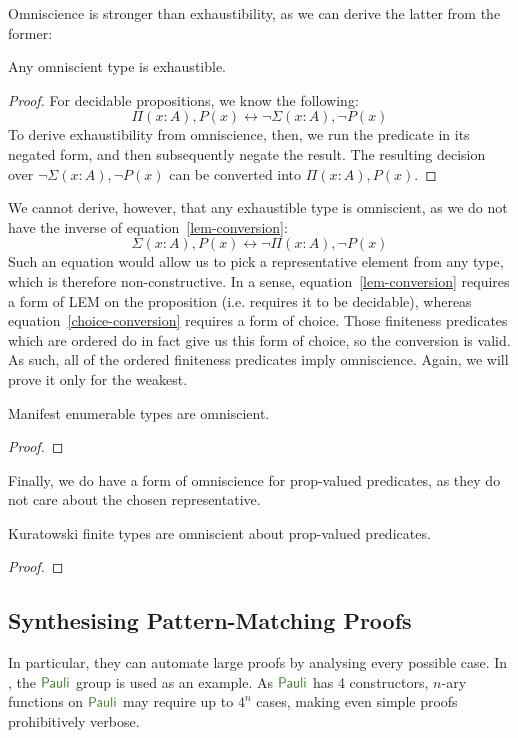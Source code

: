 Omniscience is stronger than exhaustibility, as we can derive the latter from
the former:
\begin{rm-lemma} \label{omniscient-is-exhaustible}
  Any omniscient type is exhaustible.
\end{rm-lemma}
\begin{proof}
  For decidable propositions, we know the following:
  \begin{equation} \label{lem-conversion}
    \Pi (x : A) , P(x) \leftrightarrow \neg \Sigma (x : A) , \neg P(x) 
  \end{equation}
  To derive exhaustibility from omniscience, then, we run the predicate in its
  negated form, and then subsequently negate the result.
  The resulting decision over \(\neg \Sigma(x : A) , \neg P(x)\) can be
  converted into \(\Pi (x : A) , P(x)\).
\end{proof}
We cannot derive, however, that any exhaustible type is omniscient, as we do not
have the inverse of equation~\ref{lem-conversion}:
\begin{equation} \label{choice-conversion}
  \Sigma (x : A) , P(x) \leftrightarrow \neg \Pi (x : A) , \neg P(x)
\end{equation}
Such an equation would allow us to pick a representative element from any type,
which is therefore non-constructive.
In a sense, equation~\ref{lem-conversion} requires a form of LEM on the
proposition (i.e. requires it to be decidable), whereas
equation~\ref{choice-conversion} requires a form of choice.
Those finiteness predicates which are ordered do in fact give us this form of
choice, so the conversion is valid.
As such, all of the ordered finiteness predicates imply omniscience.
Again, we will prove it only for the weakest.
\begin{rm-theorem}
  Manifest enumerable types are omniscient.
\end{rm-theorem}
\begin{proof}
\end{proof}
Finally, we do have a form of omniscience for prop-valued predicates, as they do
not care about the chosen representative.
\begin{rm-theorem}
  Kuratowski finite types are omniscient about prop-valued predicates.
\end{rm-theorem}
\begin{proof}
\end{proof}
\subsection{Synthesising Pattern-Matching Proofs}
In particular, they can automate large proofs by analysing every possible case.
In \cite{firsovDependentlyTypedProgramming2015}, the \(\AgdaDatatype{Pauli}\)
group is used as an example.
As \(\AgdaDatatype{Pauli}\) has 4 constructors, \(n\)-ary functions on
\(\AgdaDatatype{Pauli}\) may require up to \(4^n\) cases, making even simple
proofs prohibitively verbose.

